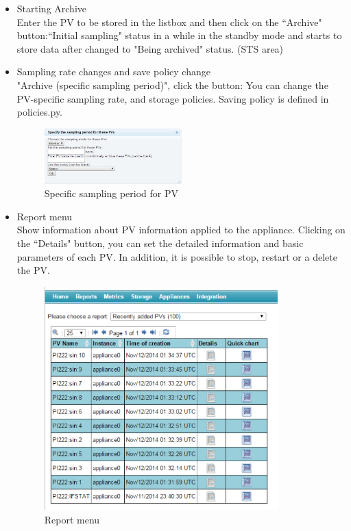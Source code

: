 \documentclass[11pt
  , a4paper
  , article
  , oneside
]{memoir}
\begin{document}
\begin{itemize}
	\item Starting Archive\\
	Enter the PV to be stored in the listbox and then click on the ``Archive" button:``Initial sampling" status in a while in the standby mode and starts to store data after changed to "Being archived" status. (STS area)
	\clearpage
	\item Sampling rate changes and save policy change\\
	"Archive (specific sampling period)", click the button: You can change the PV-specific sampling rate, and storage policies.
	Saving policy is defined in policies.py.
		\begin{figure}[h!]
			\centering
			\includegraphics[width=0.5\textwidth, height=0.3\textwidth]{./images/9.png}
			\caption{Specific sampling period for PV}
		\end{figure}
	\item Report menu \\
	Show information about PV information applied to the appliance. Clicking on the ``Details" button, you can set the detailed information and basic parameters of each PV. In addition, it is possible to stop, restart or a delete the PV. 
	\begin{figure}[h!]
		\centering
		\includegraphics[width=0.85\textwidth, height=0.6\textwidth]{./images/report.eps}
		\caption{Report menu}
	\end{figure}
	\clearpage
	

\end{itemize}
\end{document}
